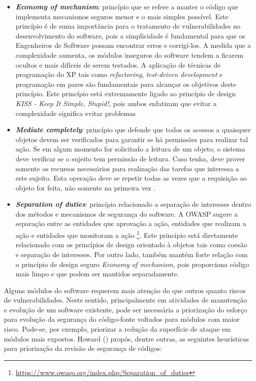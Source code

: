 \begin{itemize}
\item \textbf{\emph{Economy of mechanism}}: princípio que se refere a manter o código que implementa mecanismos seguros menor e o mais simples possível. Este princípio é de suma importância para o tratamento de vulnerabilidades no desenvolvimento do software, pois a simplicidade é fundamental para que os Engenheiros de Software possam encontrar erros e corrigí-los. A medida que a complexidade aumenta, os módulos inseguros do software tendem a ficarem ocultos e mais difíceis de serem testados. A aplicação de técnicas de programação do XP tais como \emph{refactoring}, \emph{test-driven development} e programação em pares são fundamentais para alcançar os objetivos deste princípio. Este princípio está extremamente ligado ao princípio de design \emph{KISS - Keep It Simple, Stupid!}, pois ambos enfatizam que evitar a complexidade significa evitar problemas \cite{mcgraw2002}
\item \textbf{\emph{Mediate completely}}: princípio que defende que todos os acessos a quaisquer objetos devem ser verificados para garantir se há permissões para realizar tal ação. Se em algum momento for solicitado a leitura de um objeto, o sistema deve verificar se o sujeito tem permissão de leitura. Caso tenha, deve prover somente os recursos necessários para realização das tarefas que interessa a este sujeito. Esta operação deve se repetir todas as vezes que a requisição ao objeto for feita, não somente na primeira vez \cite{bishop2003}.
\item \textbf{\emph{Separation of duties}}: princípio relacionado a separação de interesses dentro dos métodos e mecanismos de segurança do software. A OWASP sugere a separação entre as entidades que aprovação a ação, entidades que realizam a ação e entidades que monitoram a ação \footnote{\url{https://www.owasp.org/index.php/Separation_of_duties}}. Este princípio está diretamente relacionado com os princípios de design orientado à objetos tais como coesão e separação de interesses. Por outro lado, também mantém forte relação com o princípio de design seguro \emph{Economy of mechanism}, pois proporciona código mais limpo e que podem ser mantidos separadamente.
\end{itemize}


Alguns módulos do software requerem mais atenção do que outros quanto riscos de vulnerabilidades. Neste sentido, principalmente em atividades de manutenção e evolução de um software existente, pode ser necessária a priorização do esforço para evolução da segurança do código-fonte voltados para módulos com maior risco. Pode-se, por exemplo, priorizar a redução da superfície de ataque em módulos mais expostos. Howard (\citeyear{howard2006}) propôs, dentre outras, as seguintes heurísticas para priorização da revisão de segurança de códigos:

